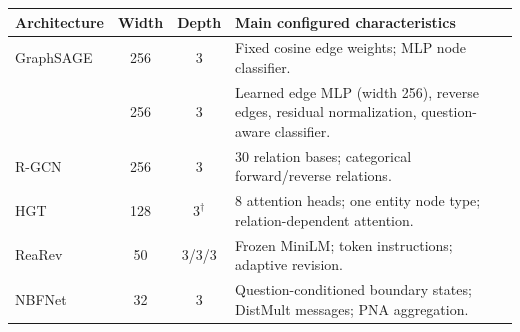 \begingroup
\small
\begin{tabularx}{\textwidth}{@{}lccX@{}}
\toprule
Architecture & Width & Depth & Main configured characteristics \\
\midrule
GraphSAGE & 256 & 3 & Fixed cosine edge weights; MLP node classifier. \\
\method{} & 256 & 3 & Learned edge MLP (width 256), reverse edges, residual normalization, question-aware classifier. \\
R-GCN & 256 & 3 & 30 relation bases; categorical forward/reverse relations. \\
HGT & 128 & $3^{\dagger}$ & 8 attention heads; one entity node type; relation-dependent attention. \\
ReaRev & 50 & 3/3/3 & Frozen MiniLM; token instructions; adaptive revision. \\
NBFNet & 32 & 3 & Question-conditioned boundary states; DistMult messages; PNA aggregation. \\
\bottomrule
\end{tabularx}
\endgroup
